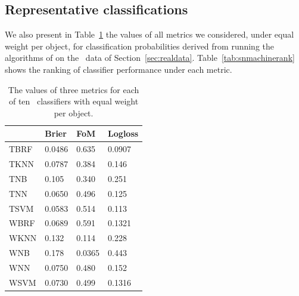 \subsection{Representative classifications}
\label{sec:realresults}

We also present in Table~\ref{tab:snmachinevals} the values of all metrics we considered, under equal weight per object, for classification probabilities derived from running the algorithms of \citet{lochner_photometric_2016} on the \snphotcc\ data of Section~\ref{sec:realdata}.
Table~\ref{tab:snmachinerank} shows the ranking of classifier performance under each metric.

\begin{table}[]
\begin{tabular}{llll}
& Brier   & FoM   & Logloss            \\
\hline
TBRF  					& 0.0486  & 0.635  & 0.0907  \\
TKNN            & 0.0787  & 0.384 & 0.146  \\
TNB             & 0.105  & 0.340  & 0.251 \\
TNN							& 0.0650  & 0.496   & 0.125 \\
TSVM            & 0.0583 & 0.514  & 0.113 \\
WBRF   					& 0.0689  & 0.591  & 0.1321 \\
WKNN            & 0.132  & 0.114 & 0.228 \\
WNB             & 0.178  & 0.0365 & 0.443  \\
WNN 						& 0.0750  & 0.480  & 0.152 \\
WSVM            & 0.0730  & 0.499  & 0.1316 \\
\end{tabular}
\caption{The values of three metrics for each of ten \snmachine\ classifiers with equal weight per object.}
	\label{tab:snmachinevals}
\end{table}

